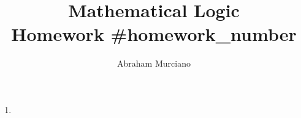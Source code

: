 \documentclass[fleqn]{article}
\title{Mathematical Logic \\
\medskip
\large Homework #{homework_number}}
\author{Abraham Murciano}
\newenvironment{answers}{ %
	\begin{enumerate}
		\setlength{\itemsep}{\bigskipamount}
}{\end{enumerate}}
\begin{document}
\maketitle

\begin{answers}

    \item

\end{answers}
\end{document}
